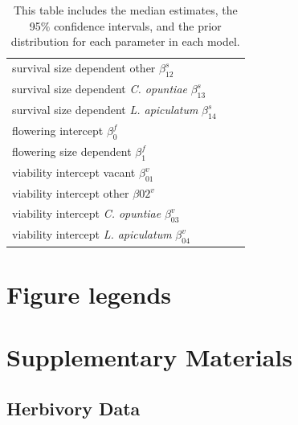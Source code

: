 \documentclass[11pt]{article}
\begin{document}
\begin{table}[]
\begin{tabular}{l|l|l}
    survival size dependent other $\beta_{12}^s$ & & \\
    survival size dependent \textit{C. opuntiae} $\beta_{13}^s$ & & \\
    survival size dependent \textit{L. apiculatum} $\beta_{14}^s$ & & \\
    \hline
    flowering intercept $\beta_0^f$ & & \\
    flowering size dependent $\beta_1^f$ & & \\
    \hline
    viability intercept vacant $\beta_01^v$ & & \\
    viability intercept other $\beta02^v$ & & \\
    viability intercept \textit{C. opuntiae} $\beta_03^v$ & & \\
    viability intercept \textit{L. apiculatum} $\beta_04^v$ & & 

  \end{tabular}
  \caption{This table includes the median estimates, the 95$\%$ confidence intervals, and the prior distribution for each parameter in each model.}
  \label{tab:Params}
  \end{table}

\section*{Figure legends}

\section*{Supplementary Materials}
\subsection*{Herbivory Data}
\end{document}
